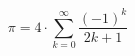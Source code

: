 \begin{equation}
  \pi = 4 \cdot 
  \sum\limits_{k=0}^\infty
  \frac{(-1)^k} {2 k + 1}
\end{equation}
